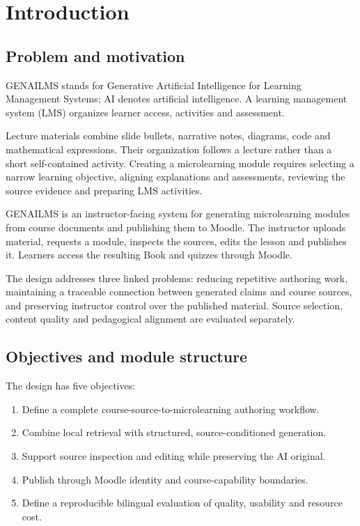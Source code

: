 \section{Introduction}\label{sec:introduction}
\subsection{Problem and motivation}
GENAILMS stands for Generative Artificial Intelligence for Learning Management Systems; AI denotes artificial intelligence. A learning management system (LMS) organizes learner access, activities and assessment.

Lecture materials combine slide bullets, narrative notes, diagrams, code and mathematical expressions. Their organization follows a lecture rather than a short self-contained activity. Creating a microlearning module requires selecting a narrow learning objective, aligning explanations and assessments, reviewing the source evidence and preparing LMS activities.

GENAILMS is an instructor-facing system for generating microlearning modules from course documents and publishing them to Moodle. The instructor uploads material, requests a module, inspects the sources, edits the lesson and publishes it. Learners access the resulting Book and quizzes through Moodle.

The design addresses three linked problems: reducing repetitive authoring work, maintaining a traceable connection between generated claims and course sources, and preserving instructor control over the published material. Source selection, content quality and pedagogical alignment are evaluated separately.
\subsection{Objectives and module structure}
The design has five objectives:
\begin{enumerate}[label=O\arabic*.,leftmargin=*]
\item Define a complete course-source-to-microlearning authoring workflow.
\item Combine local retrieval with structured, source-conditioned generation.
\item Support source inspection and editing while preserving the AI original.
\item Publish through Moodle identity and course-capability boundaries.
\item Define a reproducible bilingual evaluation of quality, usability and resource cost.
\end{enumerate}

